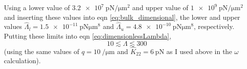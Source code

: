 \documentclass[12pt]{article}
\begin{document}
Using a lower value of $\SI{3.2e7}{\pico\newton\per\micro\meter^2}$ and upper value of $\SI{1e9}{\pico\newton\per\micro\meter^2}$ and inserting these values into eqn \ref{eq:bulk_dimensional}, the lower and upper values $\hat{\Lambda}_l=\SI{1.5e-11}{\pico\newton\micro\meter^8}$ and $\hat{\Lambda}_u=\SI{4.8e-10}{\pico\newton\micro\meter^8}$, respectively. Putting these limits into eqn \ref{eq:dimensionlessLambda},
\begin{equation}\label{eq:Lambda}
10\lesssim\Lambda\lesssim300
\end{equation}
(using the same values of $\hat{q}=\SI{10}{\per\micro\meter}$ and $\hat{K}_{22}=\SI{6}{\pico\newton}$ as I used above in the $\omega$ calculation).
\clearpage


\end{document}
